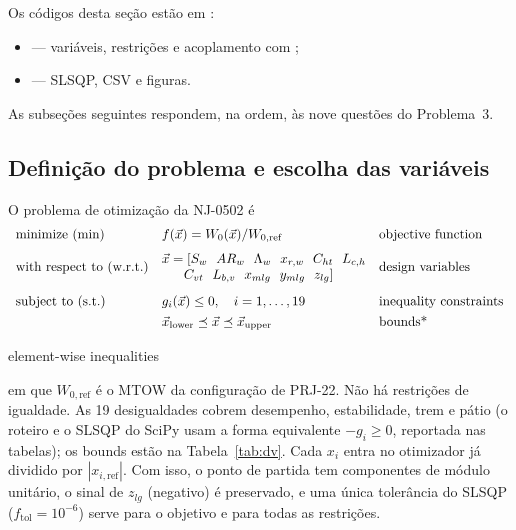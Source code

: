 Os códigos desta seção estão em :
\begin{itemize}
\item {} --- variáveis, restrições e acoplamento com
      ;
\item {} --- SLSQP, CSV e figuras.
\end{itemize}

As subseções seguintes respondem, na ordem, às nove questões do
Problema~3.

\subsection{Definição do problema e escolha das variáveis}
\label{sec:p3q1}

O problema de otimização da NJ-0502 é
\begin{equation}
\begin{array}{lll}
\text{minimize (min)} &
f(\vec{x}) = W_0(\vec{x})/W_{0,\mathrm{ref}} &
\text{objective function} \\[0.65em]
\text{with respect to (w.r.t.)} &
\begin{array}{@{}l@{}}
\vec{x} = [
S_w\ \ AR_w\ \ \Lambda_w\ \ x_{r,w}\ \ C_{ht}\ \ L_{c,h} \\
\quad\ \ C_{vt}\ \ L_{b,v}\ \ x_{mlg}\ \ y_{mlg}\ \ z_{lg}
]
\end{array} &
\text{design variables} \\[1.4em]
\text{subject to (s.t.)} &
g_i(\vec{x}) \le 0,\quad i=1,\dots,19 &
\text{inequality constraints} \\[0.35em]
&
\vec{x}_{\mathrm{lower}} \preceq \vec{x} \preceq \vec{x}_{\mathrm{upper}} &
\text{bounds*}
\end{array}
\label{eq:nlp}
\end{equation}
\begin{flushright}
\vspace{-1.1em}
{\small * element-wise inequalities}
\end{flushright}
em que $W_{0,\mathrm{ref}}$ é o MTOW da configuração de PRJ-22. Não há
restrições de igualdade. As 19 desigualdades cobrem desempenho,
estabilidade, trem e pátio (o roteiro e o SLSQP do SciPy usam a forma
equivalente $-g_i\ge 0$, reportada nas tabelas); os bounds estão na
Tabela~\ref{tab:dv}. Cada $x_i$ entra no otimizador já dividido por
$|x_{i,\mathrm{ref}}|$. Com isso, o ponto de partida tem componentes de
módulo unitário, o sinal de $z_{lg}$ (negativo) é preservado, e uma
única tolerância do SLSQP ($f_{\mathrm{tol}}=10^{-6}$) serve para o
objetivo e para todas as restrições.

